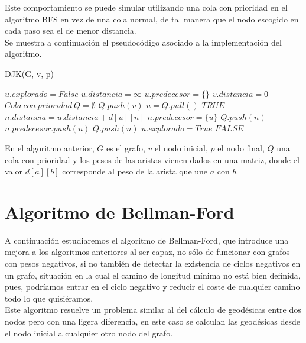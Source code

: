 Este comportamiento se puede simular utilizando una cola con prioridad en el algoritmo BFS en vez de una cola normal, de tal manera que el nodo escogido en cada paso sea el de menor distancia. \\

Se muestra a continuación el pseudocódigo asociado a la implementación del algoritmo.

\begin{breakablealgorithm}
	\caption{DJK(G, v, p)}
	\begin{algorithmic}[1]
			\State $u.explorado = False$
			\State $u.distancia = \infty$
			\State $u.predecesor = \{\}$
		\EndFor
		\State $v.distancia = 0$
		\State $Cola\ con\ prioridad\ Q = \emptyset$
		\State $Q.push(v)$
			\State $u = Q.pull()$
					\Return $TRUE$
				\EndIf
							\State $n.distancia = u.distancia + d[u][n]$
							\State $n.predecesor = \{u\}$
							\State $Q.push(n)$
						\ElsIf{$n.distancia == u.distancia + d[u][n]$}
							\State $n.predecesor.push(u)$
							\State $Q.push(n)$
						\EndIf
					\EndIf
				\EndFor
				\State $u.explorado = True$
			\EndIf
		\EndWhile
		\Return $FALSE$
	\end{algorithmic}
\end{breakablealgorithm}

En el algoritmo anterior, $G$ es el grafo, $v$ el nodo inicial, $p$ el nodo final, $Q$ una cola con prioridad y los pesos de las aristas vienen dados en una matriz, donde el valor $d[a][b]$ corresponde al peso de la arista que une $a$ con $b$.

\section{Algoritmo de Bellman-Ford}\label{Bellman-Ford}

A continuación estudiaremos el algoritmo de Bellman-Ford, que introduce una mejora a los algoritmos anteriores al ser capaz, no sólo de funcionar con grafos con pesos negativos, si no también de detectar la existencia de ciclos negativos en un grafo, situación en la cual el camino de longitud mínima no está bien definida, pues, podríamos entrar en el ciclo negativo y reducir el coste de cualquier camino todo lo que quisiéramos. \\

Este algoritmo resuelve un problema similar al del cálculo de geodésicas entre dos nodos pero con una ligera diferencia, en este caso se calculan las geodésicas desde el nodo inicial a cualquier otro nodo del grafo. \\


